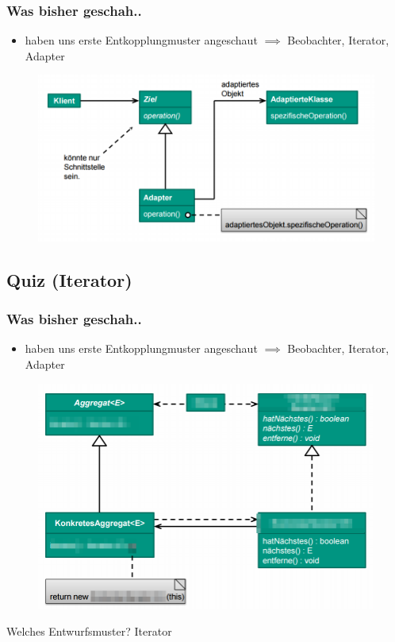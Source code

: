 \documentclass[18pt]{beamer}
\begin{document}
	\begin{frame}
		\frametitle{Was bisher geschah..}
		\begin{itemize}
			\item haben uns erste Entkopplungmuster angeschaut
			\linebreak $\implies$ Beobachter, Iterator, Adapter
		\end{itemize}
		\begin{figure}
			\includegraphics[scale=0.45]{./pics/tut3/adap-obj.png}
		\end{figure}
	\end{frame}
	
	\subsection{Quiz (Iterator)}
	\begin{frame}
		\frametitle{Was bisher geschah..}
		\begin{itemize}
			\item haben uns erste Entkopplungmuster angeschaut
			\linebreak $\implies$ Beobachter, Iterator, Adapter
		\end{itemize}
		\begin{figure}
			\includegraphics[scale=0.25]{./pics/tut4/iter-mod.png}
		\end{figure}
		Welches Entwurfsmuster? \pause Iterator
	\end{frame}
	
\end{document}
